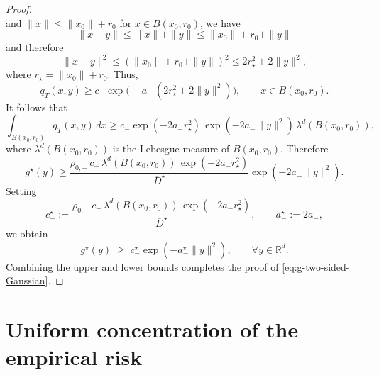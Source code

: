\documentclass[11pt]{article}
\theoremstyle{remark}
\numberwithin{equation}{section}
\newcommand{\R}{\mathbb{R}}
\def\amin{a_{-}}
\def\cmin{c_{-}}
\def\rhomin{\rho_{0,-}}
\def\aStarmin{a_{-}^\star}
\def\cStarmin{c_{-}^\star}
\begin{document}
\begin{proof}
\[\]
and  $\|x\|\le \|x_0\|+r_0$ for $x\in B(x_0,r_0)$, we have
\[
  \|x-y\|
  \le \|x\| + \|y\|
  \le \|x_0\|+r_0 + \|y\|
\]
and therefore
\[
  \|x-y\|^2 \le (\|x_0\|+r_0+\|y\|)^2 \le 2 r_\star^2 + 2\|y\|^2,
\]
where $r_\star = \|x_0\|+r_0$. Thus,
\[
  q_T(x,y)
  \ge
  \cmin \exp\bigl(-\amin\,(2 r_\star^2 + 2\|y\|^2)\bigr),
  \qquad x\in B(x_0,r_0).
\]
It follows that
\[
  \int_{B(x_0,r_0)} q_T(x,y)\,dx
  \ge
  \cmin \exp(-2 \amin r_\star^2)\,\exp(-2 \amin \|y\|^2)\,\lambda^d(B(x_0,r_0)),
\]
where $\lambda^d(B(x_0,r_0))$ is the Lebesgue measure of $B(x_0,r_0)$.
Therefore
\[
  g^\star(y)
  \ge
  \frac{\rhomin\, \cmin\,\lambda^d(B(x_0,r_0))\,\exp(-2\amin r_\star^2)}{\overline{D}^\star}
  \exp(-2 \amin \|y\|^2).
\]
Setting
\[
  \cStarmin
  :=
  \frac{\rhomin\, \cmin\,\lambda^d(B(x_0,r_0))\,\exp(-2\amin r_\star^2)}{\overline{D}^\star},
  \qquad
  \aStarmin := 2 \amin,
\]
we obtain
\[
  g^\star(y)
  \;\ge\;
  \cStarmin \exp(-\aStarmin \|y\|^2),
  \qquad \forall y\in \R^d.
\]
Combining the upper and lower bounds completes the proof of
\eqref{eq:g-two-sided-Gaussian}.
\end{proof}




\section{Uniform concentration of the empirical risk}
\label{sec uniform concentration}
\end{document}
